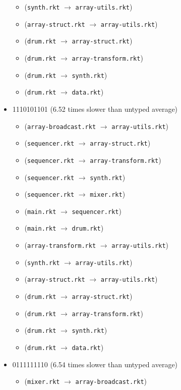 \documentclass{article}
\newcommand{\mono}[1]{\texttt{#1}}
\begin{document}
\begin{itemize}
\begin{itemize}
  \item (\mono{synth.rkt} $\rightarrow$ \mono{array-utils.rkt})
  \item (\mono{array-struct.rkt} $\rightarrow$ \mono{array-utils.rkt})
  \item (\mono{drum.rkt} $\rightarrow$ \mono{array-struct.rkt})
  \item (\mono{drum.rkt} $\rightarrow$ \mono{array-transform.rkt})
  \item (\mono{drum.rkt} $\rightarrow$ \mono{synth.rkt})
  \item (\mono{drum.rkt} $\rightarrow$ \mono{data.rkt})
  \end{itemize}
\item 1110101101 (6.52 times slower than untyped average)
  \begin{itemize}
  \item (\mono{array-broadcast.rkt} $\rightarrow$ \mono{array-utils.rkt})
  \item (\mono{sequencer.rkt} $\rightarrow$ \mono{array-struct.rkt})
  \item (\mono{sequencer.rkt} $\rightarrow$ \mono{array-transform.rkt})
  \item (\mono{sequencer.rkt} $\rightarrow$ \mono{synth.rkt})
  \item (\mono{sequencer.rkt} $\rightarrow$ \mono{mixer.rkt})
  \item (\mono{main.rkt} $\rightarrow$ \mono{sequencer.rkt})
  \item (\mono{main.rkt} $\rightarrow$ \mono{drum.rkt})
  \item (\mono{array-transform.rkt} $\rightarrow$ \mono{array-utils.rkt})
  \item (\mono{synth.rkt} $\rightarrow$ \mono{array-utils.rkt})
  \item (\mono{array-struct.rkt} $\rightarrow$ \mono{array-utils.rkt})
  \item (\mono{drum.rkt} $\rightarrow$ \mono{array-struct.rkt})
  \item (\mono{drum.rkt} $\rightarrow$ \mono{array-transform.rkt})
  \item (\mono{drum.rkt} $\rightarrow$ \mono{synth.rkt})
  \item (\mono{drum.rkt} $\rightarrow$ \mono{data.rkt})
  \end{itemize}
\item 0111111110 (6.54 times slower than untyped average)
  \begin{itemize}
  \item (\mono{mixer.rkt} $\rightarrow$ \mono{array-broadcast.rkt})

\end{itemize}
\end{itemize}
\end{document}

